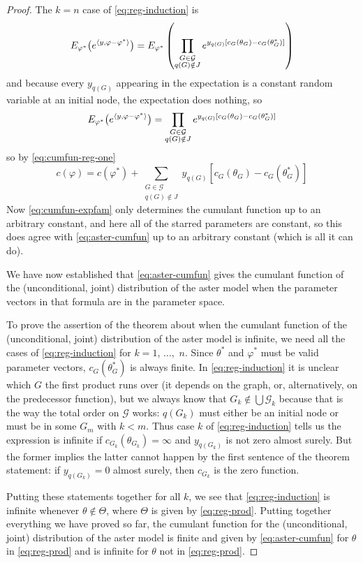 \begin{proof}
The $k = n$ case of \eqref{eq:reg-induction} is
$$
   E_{\varphi^*}\bigl( e^{\langle y, \varphi - \varphi^* \rangle} \bigr)
   =
   E_{\varphi^*}\left(
   \prod_{\substack{G \in \mathcal{G} \\ q(G) \notin J}}
   e^{y_{q(G)} [c_G(\theta_G) - c_G(\theta_G^*)]}
   \right)
$$
and because every $y_{q(G)}$ appearing in the expectation is a constant
random variable at an initial node, the expectation does nothing, so
$$
   E_{\varphi^*}\bigl( e^{\langle y, \varphi - \varphi^* \rangle} \bigr)
   =
   \prod_{\substack{G \in \mathcal{G} \\ q(G) \notin J}}
   e^{y_{q(G)} [c_G(\theta_G) - c_G(\theta_G^*)]}
$$
so by \eqref{eq:cumfun-reg-one}
$$
   c(\varphi) = c(\varphi^*)
   + \sum_{\substack{G \in \mathcal{G} \\ q(G) \notin J}}
   y_{q(G)} [c_G(\theta_G) - c_G(\theta_G^*)]
$$
Now \eqref{eq:cumfun-expfam} only determines the cumulant function up
to an arbitrary constant, and here all of the starred parameters are
constant, so this does agree with \eqref{eq:aster-cumfun} up to an
arbitrary constant (which is all it can do).

We have now established that \eqref{eq:aster-cumfun} gives the
cumulant function of the (unconditional, joint) distribution of the
aster model when the parameter vectors in that formula are in the
parameter space.

To prove the assertion of the theorem about when the cumulant function
of the (unconditional, joint) distribution of the aster model is infinite,
we need all the cases of \eqref{eq:reg-induction} for $k = 1$, $\ldots,$ $n$.
Since $\theta^*$ and $\varphi^*$ must be valid parameter vectors,
$c_G(\theta_G^*)$ is always finite.
In \eqref{eq:reg-induction} it is unclear which $G$ the first product
runs over (it depends on the graph, or, alternatively, on the predecessor
function), but we always know that $G_k \notin \bigcup \mathcal{G}_k$
because that is the way the total order on $\mathcal{G}$ works:
$q(G_k)$ must either be an initial node or must be in some $G_m$ with $k < m$.
Thus case $k$ of \eqref{eq:reg-induction} tells us the expression is
infinite if $c_{G_k}(\theta_{G_k}) = \infty$ and $y_{q(G_k)}$ is not
zero almost surely.  But the former implies the latter cannot happen
by the first sentence of the theorem statement: if $y_{q(G_k)} = 0$
almost surely, then $c_{G_k}$ is the zero function.

Putting these statements together for all $k$, we see that
\eqref{eq:reg-induction} is infinite whenever $\theta \notin \Theta$,
where $\Theta$ is given by \eqref{eq:reg-prod}.
Putting together everything we have proved so far,
the cumulant function for the (unconditional, joint) distribution of
the aster model is finite and given by \eqref{eq:aster-cumfun} for
$\theta$ in \eqref{eq:reg-prod} and is infinite for
$\theta$ not in \eqref{eq:reg-prod}.


\end{proof}
